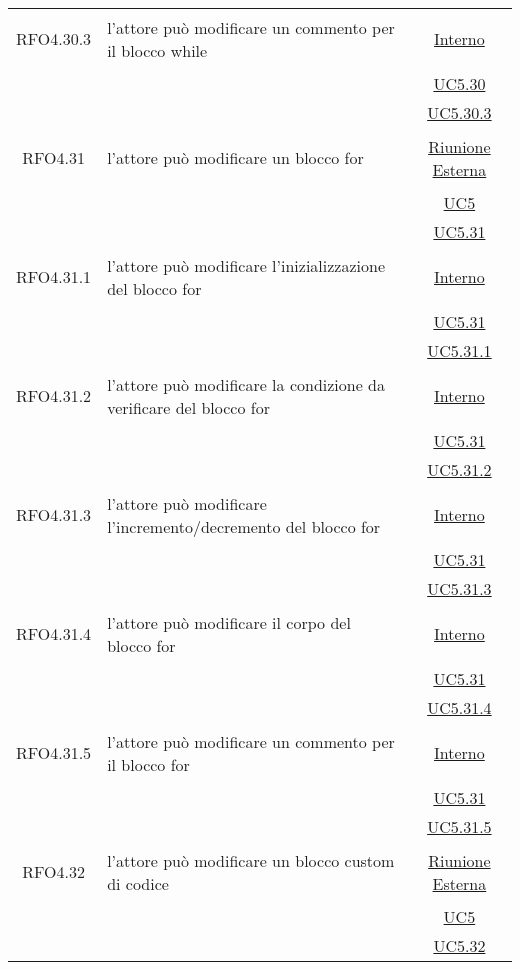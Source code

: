 \begin{longtable}{|c|>{\centering}m{7cm}|c|}
\hypertarget{RFO4.30.3}{RFO4.30.3} & l'attore può modificare un commento per il blocco while & \hyperlink{Interno}{Interno}\\
& &\hyperref[UC5.30]{UC5.30}\\
& &\hyperref[UC5.30.3]{UC5.30.3}\\ \hline

\hypertarget{RFO4.31}{RFO4.31} & l'attore può modificare un blocco for &  \hyperlink{Riunione Esterna}{Riunione Esterna}\\
& &\hyperref[UC5]{UC5}\\
& &\hyperref[UC5.31]{UC5.31}\\ \hline

\hypertarget{RFO4.31.1}{RFO4.31.1} & l'attore può modificare l'inizializzazione del blocco for & \hyperlink{Interno}{Interno}\\
& &\hyperref[UC5.31]{UC5.31}\\
& &\hyperref[UC5.31.1]{UC5.31.1}\\ \hline

\hypertarget{RFO4.31.2}{RFO4.31.2} & l'attore può modificare la condizione da verificare del blocco for & \hyperlink{Interno}{Interno}\\
& &\hyperref[UC5.31]{UC5.31}\\
& &\hyperref[UC5.31.2]{UC5.31.2}\\ \hline

\hypertarget{RFO4.31.3}{RFO4.31.3} & l'attore può modificare l'incremento/decremento del blocco for & \hyperlink{Interno}{Interno}\\
& &\hyperref[UC5.31]{UC5.31}\\
& &\hyperref[UC5.31.3]{UC5.31.3}\\ \hline

\hypertarget{RFO4.31.4}{RFO4.31.4} & l'attore può modificare il corpo del blocco for &\hyperlink{Interno}{Interno}\\
& &\hyperref[UC5.31]{UC5.31}\\
& &\hyperref[UC5.31.4]{UC5.31.4}\\ \hline

\hypertarget{RFO4.31.5}{RFO4.31.5} & l'attore può modificare un commento per il blocco for & \hyperlink{Interno}{Interno}\\
& &\hyperref[UC5.31]{UC5.31}\\
& &\hyperref[UC5.31.5]{UC5.31.5}\\ \hline

\hypertarget{RFO4.32}{RFO4.32} & l'attore può modificare un blocco custom di codice & \hyperlink{Riunione Esterna}{Riunione Esterna}\\
& &\hyperref[UC5]{UC5}\\
& &\hyperref[UC5.32]{UC5.32}\\ \hline


\end{longtable}
